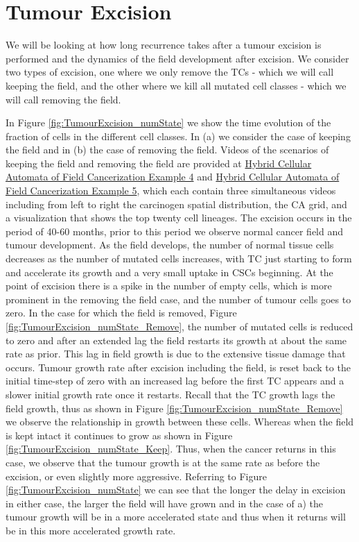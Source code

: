 \documentclass[\main/thesis.tex]{subfiles}
\begin{document}
\section{Tumour Excision}
We will be looking at how long recurrence takes after a tumour excision is performed and the dynamics of the field development after excision. We consider two types of excision, one where we only remove the TCs - which we will call keeping the field, and the other where we kill all mutated cell classes - which we will call removing the field. 

In Figure \ref{fig:TumourExcision_numState} we show the time evolution of the fraction of cells in the different cell classes. In (a) we consider the case of keeping the field and in (b) the case of removing the field. Videos of the scenarios of keeping the field and removing the field are provided at \href{https://youtu.be/zngGzjSlPwU}{Hybrid Cellular Automata of Field Cancerization Example 4} and \href{https://youtu.be/EOFI4Ai1A9U}{Hybrid Cellular Automata of Field Cancerization Example 5}, which each contain three simultaneous videos including from left to right the carcinogen spatial distribution, the CA grid, and a visualization that shows the top twenty cell lineages. The excision occurs in the period of 40-60 months, prior to this period we observe normal cancer field and tumour development. As the field develops, the number of normal tissue cells decreases as the number of mutated cells increases, with TC just starting to form and accelerate its growth and a very small uptake in CSCs beginning. At the point of excision there is a spike in the number of empty cells, which is more prominent in the removing the field case, and the number of tumour cells goes to zero. In the case for which the field is removed, Figure \ref{fig:TumourExcision_numState_Remove}, the number of mutated cells is reduced to zero and after an extended lag the field restarts its growth at about the same rate as prior. This lag in field growth is due to the extensive tissue damage that occurs. Tumour growth rate after excision including the field, is reset back to the initial time-step of zero with an increased lag before the first TC appears and a slower initial growth rate once it restarts. Recall that the TC growth lags the field growth, thus as shown in Figure \ref{fig:TumourExcision_numState_Remove} we observe the relationship in growth between these cells. Whereas when the field is kept intact it continues to grow as shown in Figure \ref{fig:TumourExcision_numState_Keep}. Thus, when the cancer returns in this case, we observe that the tumour growth is at the same rate as before the excision, or even slightly more aggressive. Referring to Figure \ref{fig:TumourExcision_numState} we can see that the longer the delay in excision in either case, the larger the field will have grown and in the case of a) the tumour growth will be in a more accelerated state and thus when it returns will be in this more accelerated growth rate.
\end{document}

